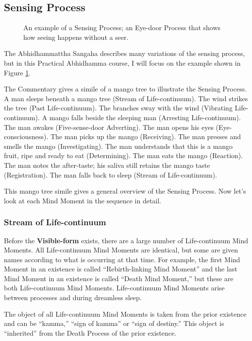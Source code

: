\subsection*{Sensing Process}

\begin{figure}[H]
\centering

\caption{An example of a Sensing Process; an Eye-door Process that shows how seeing happens without a seer.}
\label{fig:Process}
\end{figure}


The Abhidhammattha Sangaha describes many variations of the sensing process, but in this Practical Abhidhamma course, I will focus on the example shown in Figure \ref{fig:Process}.

The Commentary gives a simile of a mango tree to illustrate the Sensing Process. A man sleeps beneath a mango tree (Stream of Life-continuum). The wind strikes the tree (Past Life-continuum). The branches sway with the wind (Vibrating Life-continuum). A mango falls beside the sleeping man (Arresting Life-continuum). The man awakes (Five-sense-door Adverting). The man opens his eyes (Eye-consciousness). The man picks up the mango (Receiving). The man presses and smells the mango (Investigating). The man understands that this is a mango fruit, ripe and ready to eat (Determining). The man eats the mango (Reaction). The man notes the after-taste; his saliva still retains the mango taste (Registration). The man falls back to sleep (Stream of Life-continuum).

This mango tree simile gives a general overview of the Sensing Process. Now let’s look at each Mind Moment in the sequence in detail.

\subsubsection*{Stream of Life-continuum}

Before the \textbf{Visible-form} exists, there are a large number of Life-continuum Mind Moments. All Life-continuum Mind Moments are identical, but some are given names according to what is occurring at that time. For example, the first Mind Moment in an existence is called “Rebirth-linking Mind Moment” and the last Mind Moment in an existence is called “Death Mind Moment,” but these are both Life-continuum Mind Moments. Life-continuum Mind Moments arise between processes and during dreamless sleep.

The object of all Life-continuum Mind Moments is taken from the prior existence and can be “kamma,” “sign of kamma” or “sign of destiny.” This object is “inherited” from the Death Process of the prior existence. 

